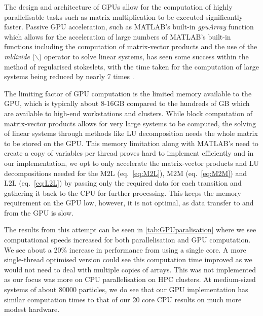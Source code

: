 The design and architecture of GPUs allow for the computation of highly parallelisable tasks such as matrix multiplication to be executed significantly faster. Passive GPU acceleration, such as MATLAB's built-in \textit{gpuArray} function which allows for the acceleration of large numbers of MATLAB's built-in functions including the computation of matrix-vector products and the use of the \textit{mldivide} ($\backslash$) operator to solve linear systems, has seen some success within the method of regularised stokeslets, with the time taken for the computation of large systems being reduced by nearly 7 times \cite{Gallagher2020}. 

The limiting factor of GPU computation is the limited memory available to the GPU, which is typically about 8-16GB compared to the hundreds of GB which are available to high-end workstations and clusters. While block computation of matrix-vector products allows for very large systems to be computed, the solving of linear systems through methods like LU decomposition needs the whole matrix to be stored on the GPU. This memory limitation along with MATLAB's need to create a copy of variables per thread proves hard to implement efficiently and in our implementation, we opt to only accelerate the matrix-vector products and LU decompositions needed for the M2L (eq.~\ref{eq:M2L}), M2M (eq.~\ref{eq:M2M}) and L2L (eq.~\ref{eq:L2L}) by passing only the required data for each transition and gathering it back to the CPU for further processing. This keeps the memory requirement on the GPU low, however, it is not optimal, as data transfer to and from the GPU is slow. 

The results from this attempt can be seen in \cref{tab:GPUparalisation} where we see computational speeds increased for both parallelisation and GPU computation. We see about a 20\% increase in performance from using a single core. A more single-thread optimised version could see this computation time improved as we would not need to deal with multiple copies of arrays. This was not implemented as our focus was more on CPU parallelisation on HPC clusters. At medium-sized systems of about 80000 particles, we do see that our GPU implementation has similar computation times to that of our 20 core CPU results on much more modest hardware. 

